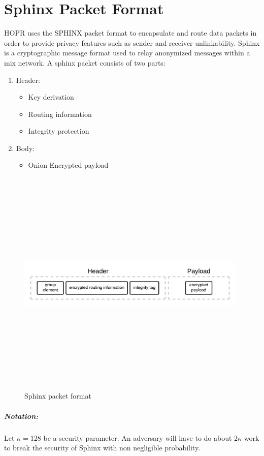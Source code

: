\section{Sphinx Packet Format}

HOPR uses the SPHINX packet format to encapsulate and route data packets in order to provide privacy features such as sender and receiver unlinkability.
Sphinx is a cryptographic message format used to relay anonymized messages within a mix network. A sphinx packet consists of two parts:

\begin{enumerate}
\item Header:
\begin{itemize}
\item Key derivation
\item Routing information
\item Integrity protection
\end{itemize}
\item Body:
\begin{itemize}
\item Onion-Encrypted payload
\end{itemize}
\end{enumerate}
\begin{figure}[H]
    \centering
    \includegraphics[width=11cm,height=11cm,keepaspectratio]{../yellowpaper/images/sphinx.jpeg}
    \caption{Sphinx packet format}
    \label{fig:Sphinx packet format}
\end{figure}
\subparagraph{Notation:}Let $\kappa=128$ be a security parameter. An adversary will have to do about $2\kappa$ work to break the security of Sphinx with non negligible probability.
